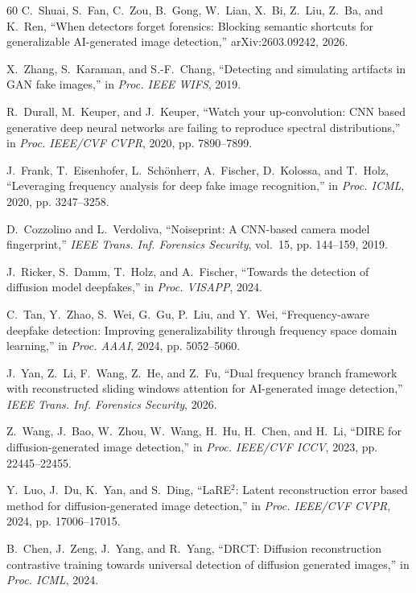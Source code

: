 \documentclass[journal]{IEEEtran}
\begin{document}
\begin{thebibliography}{60}
 C.~Shuai, S.~Fan, C.~Zou, B.~Gong, W.~Lian, X.~Bi, Z.~Liu, Z.~Ba, and K.~Ren, ``When detectors forget forensics: Blocking semantic shortcuts for generalizable AI-generated image detection,'' arXiv:2603.09242, 2026.

 X.~Zhang, S.~Karaman, and S.-F.~Chang, ``Detecting and simulating artifacts in GAN fake images,'' in \textit{Proc. IEEE WIFS}, 2019.

 R.~Durall, M.~Keuper, and J.~Keuper, ``Watch your up-convolution: CNN based generative deep neural networks are failing to reproduce spectral distributions,'' in \textit{Proc. IEEE/CVF CVPR}, 2020, pp. 7890--7899.

 J.~Frank, T.~Eisenhofer, L.~Sch\"onherr, A.~Fischer, D.~Kolossa, and T.~Holz, ``Leveraging frequency analysis for deep fake image recognition,'' in \textit{Proc. ICML}, 2020, pp. 3247--3258.

 D.~Cozzolino and L.~Verdoliva, ``Noiseprint: A CNN-based camera model fingerprint,'' \textit{IEEE Trans. Inf. Forensics Security}, vol.~15, pp. 144--159, 2019.

 J.~Ricker, S.~Damm, T.~Holz, and A.~Fischer, ``Towards the detection of diffusion model deepfakes,'' in \textit{Proc. VISAPP}, 2024.

 C.~Tan, Y.~Zhao, S.~Wei, G.~Gu, P.~Liu, and Y.~Wei, ``Frequency-aware deepfake detection: Improving generalizability through frequency space domain learning,'' in \textit{Proc. AAAI}, 2024, pp. 5052--5060.

 J.~Yan, Z.~Li, F.~Wang, Z.~He, and Z.~Fu, ``Dual frequency branch framework with reconstructed sliding windows attention for AI-generated image detection,'' \textit{IEEE Trans. Inf. Forensics Security}, 2026.

 Z.~Wang, J.~Bao, W.~Zhou, W.~Wang, H.~Hu, H.~Chen, and H.~Li, ``DIRE for diffusion-generated image detection,'' in \textit{Proc. IEEE/CVF ICCV}, 2023, pp. 22445--22455.

 Y.~Luo, J.~Du, K.~Yan, and S.~Ding, ``LaRE$^2$: Latent reconstruction error based method for diffusion-generated image detection,'' in \textit{Proc. IEEE/CVF CVPR}, 2024, pp. 17006--17015.

 B.~Chen, J.~Zeng, J.~Yang, and R.~Yang, ``DRCT: Diffusion reconstruction contrastive training towards universal detection of diffusion generated images,'' in \textit{Proc. ICML}, 2024.


\end{thebibliography}
\end{document}
